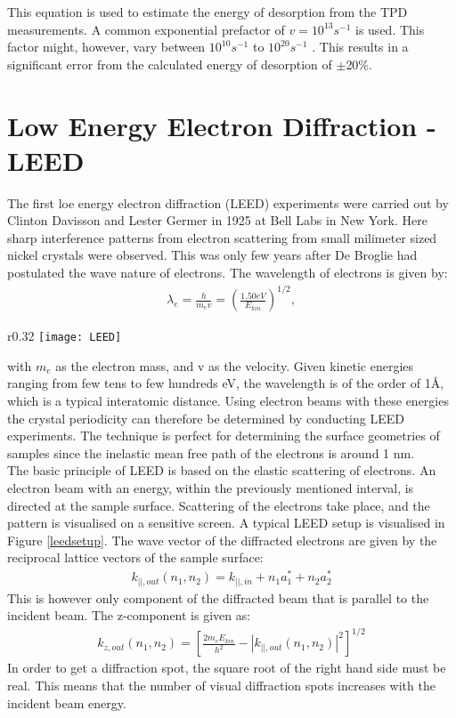 This equation is used to estimate the energy of desorption from the TPD measurements. A common exponential prefactor of $v = 10^{13} s^{-1}$ is used. This factor might, however, vary between $10^{10} s^{-1}$ to $10^{20} s^{-1}$ \cite{TPDbog}. This results in a significant error from the calculated energy of desorption of $\pm$20\%.\cite{berlinslides}

\section{Low Energy Electron Diffraction - LEED}

The first loe energy electron diffraction (LEED) experiments were carried out by Clinton Davisson and Lester Germer in 1925 at Bell Labs in New York. Here sharp interference patterns  from electron scattering from small milimeter sized nickel crystals were observed. This was only few years after De Broglie had postulated the wave nature of electrons. The wavelength of electrons is given by:\cite{held1974low}
\begin{align}
  \lambda_e = \frac{h}{m_ev} = (\frac{1.50eV}{E_{kin}})^{1/2},
\end{align}

\begin{wrapfigure}{r}{0.32\textwidth}
\centering
\texttt{[image: LEED]}
\caption{Graphical interpretaion of a LEED setup.\cite{held1974low}}
\label{leedsetup}
\end{wrapfigure}
with $m_e$ as the electron mass, and v as the velocity. Given kinetic energies ranging from few tens to few hundreds eV, the wavelength is of the order of 1Å, which is a typical interatomic distance. Using electron beams with these energies the crystal periodicity can therefore be determined by conducting LEED experiments. The technique is perfect for determining the surface geometries of samples since the inelastic mean free path of the electrons is around 1 nm.\cite{held1974low}\\
The basic principle of LEED is based on the elastic scattering of electrons. An electron beam with an energy, within the previously mentioned interval, is directed at the sample surface. Scattering of the electrons take place, and the pattern is visualised on a sensitive screen. A typical LEED setup is visualised in Figure \ref{leedsetup}. The wave vector of the diffracted electrons are given by the reciprocal lattice vectors of the sample surface:
\begin{align}
  k_{||,out} (n_1,n_2) = k_{||,in} + n_1a^*_1 + n_2a^*_2
\end{align}
This is however only component of the diffracted beam that is parallel to the incident beam. The z-component is given as:
\begin{align}
  k_{z,out}(n_1,n_2) = \left[\frac{2m_eE_{kin}}{h^2}-|k_{||,out}(n_1,n_2)|^2\right]^{1/2}
\end{align}
In order to get a diffraction spot, the square root of the right hand side must be real. This means that the number of visual diffraction spots increases with the incident beam energy.
